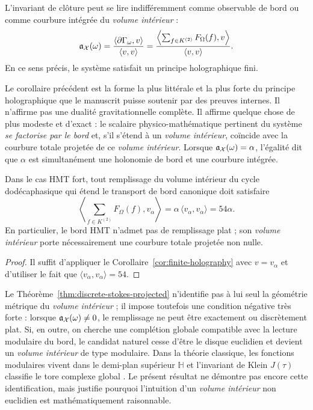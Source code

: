 \begin{corollary}\label{cor:finite-holography}
L'invariant de clôture peut se lire indifféremment comme observable de bord ou comme courbure
intégrée du \emph{volume intérieur} :
\[
\mathfrak a_\mathcal X(\omega)
=
\frac{\langle \partial\Gamma_\omega,v\rangle}{\langle v,v\rangle}
=
\frac{\left\langle \sum_{f\in K^{(2)}}F_\Omega(f),v\right\rangle}{\langle v,v\rangle}.
\]
En ce sens précis, le système satisfait un principe holographique fini.
\end{corollary}

\begin{remark}
Le corollaire précédent est la forme la plus littérale et la plus forte du principe holographique que le manuscrit
puisse soutenir par des preuves internes. Il n'affirme pas une dualité gravitationnelle complète. Il affirme quelque chose de plus
modeste et d'exact : le scalaire physico-mathématique pertinent du système \emph{se factorise par le bord} et,
s'il s'étend à un \emph{volume intérieur}, coïncide avec la courbure totale projetée de ce \emph{volume intérieur}.
Lorsque $\mathfrak a_\mathcal X(\omega)=\alpha$, l'égalité dit que $\alpha$ est simultanément une holonomie
de bord et une courbure intégrée.
\end{remark}

\begin{corollary}\label{cor:hmt-bulk-curvature}
Dans le cas HMT fort, tout remplissage du volume intérieur du cycle dodécaphasique qui étend le transport de
bord canonique doit satisfaire
\[
\left\langle \sum_{f\in K^{(2)}}F_\Omega(f),v_\alpha\right\rangle
=
\alpha\,\langle v_\alpha,v_\alpha\rangle
=
54\alpha.
\]
En particulier, le bord HMT n'admet pas de remplissage plat ; son \emph{volume intérieur} porte nécessairement une courbure
totale projetée non nulle.
\end{corollary}

\begin{proof}
Il suffit d'appliquer le Corollaire~\ref{cor:finite-holography} avec $v=v_\alpha$ et d'utiliser le fait que
$\langle v_\alpha,v_\alpha\rangle=54$.
\end{proof}



\begin{remark}
Le Théorème~\ref{thm:discrete-stokes-projected} n'identifie pas à lui seul la géométrie métrique du
\emph{volume intérieur} ; il impose toutefois une condition négative très forte : lorsque $\mathfrak a_\mathcal X(\omega)\neq 0$, le
remplissage ne peut être exactement ou discrètement plat. Si, en outre, on cherche une complétion globale
compatible avec la lecture modulaire du bord, le candidat naturel cesse d'être le disque euclidien et devient
un \emph{volume intérieur} de type modulaire. Dans la théorie classique, les fonctions modulaires vivent dans le
demi-plan supérieur $\mathbb H$ et l'invariant de Klein $J(\tau)$ classifie le tore complexe global
\cite{DLMFModular}. Le présent résultat ne démontre pas encore cette identification, mais justifie
pourquoi l'intuition d'un \emph{volume intérieur} non euclidien est mathématiquement raisonnable.
\end{remark}

